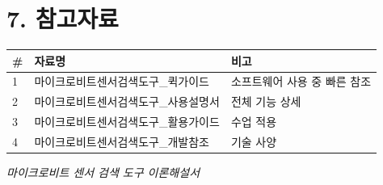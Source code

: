 \documentclass[11pt,a4paper]{article}
\begin{document}
\section*{7. 참고자료}

\begin{center}
\renewcommand{\arraystretch}{1.4}
\begin{tabular}{|p{1.5cm}|p{7.1cm}|p{6.4cm}|}
\hline
\rowcolor{tableheader}
\textbf{\#} & \textbf{자료명} & \textbf{비고} \\
\hline
1 & 마이크로비트센서검색도구\_퀵가이드 & 소프트웨어 사용 중 빠른 참조 \\
\hline
2 & 마이크로비트센서검색도구\_사용설명서 & 전체 기능 상세 \\
\hline
3 & 마이크로비트센서검색도구\_활용가이드 & 수업 적용 \\
\hline
4 & 마이크로비트센서검색도구\_개발참조 & 기술 사양 \\
\hline
\end{tabular}
\end{center}


\vfill
\begin{center}
\small\color{lightbrown}
\textit{마이크로비트 센서 검색 도구 이론해설서}
\end{center}
\end{document}
